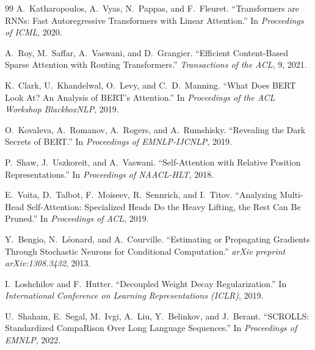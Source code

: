 \documentclass[12pt,a4paper,oneside]{book}
\begin{document}
\begin{thebibliography}{99}
A.~Katharopoulos, A.~Vyas, N.~Pappas, and F.~Fleuret.
``Transformers are RNNs: Fast Autoregressive Transformers with Linear Attention.''
In \textit{Proceedings of ICML}, 2020.

A.~Roy, M.~Saffar, A.~Vaswani, and D.~Grangier.
``Efficient Content-Based Sparse Attention with Routing Transformers.''
\textit{Transactions of the ACL}, 9, 2021.

K.~Clark, U.~Khandelwal, O.~Levy, and C.~D.~Manning.
``What Does BERT Look At? An Analysis of BERT's Attention.''
In \textit{Proceedings of the ACL Workshop BlackboxNLP}, 2019.

O.~Kovaleva, A.~Romanov, A.~Rogers, and A.~Rumshisky.
``Revealing the Dark Secrets of BERT.''
In \textit{Proceedings of EMNLP-IJCNLP}, 2019.

P.~Shaw, J.~Uszkoreit, and A.~Vaswani.
``Self-Attention with Relative Position Representations.''
In \textit{Proceedings of NAACL-HLT}, 2018.

E.~Voita, D.~Talbot, F.~Moiseev, R.~Sennrich, and I.~Titov.
``Analyzing Multi-Head Self-Attention: Specialized Heads Do the Heavy Lifting,
  the Rest Can Be Pruned.''
In \textit{Proceedings of ACL}, 2019.

Y.~Bengio, N.~Léonard, and A.~Courville.
``Estimating or Propagating Gradients Through Stochastic Neurons for Conditional
  Computation.''
\textit{arXiv preprint arXiv:1308.3432}, 2013.

I.~Loshchilov and F.~Hutter.
``Decoupled Weight Decay Regularization.''
In \textit{International Conference on Learning Representations (ICLR)}, 2019.

U.~Shaham, E.~Segal, M.~Ivgi, A.~Liu, Y.~Belinkov, and J.~Berant.
``SCROLLS: Standardized CompaRison Over Long Language Sequences.''
In \textit{Proceedings of EMNLP}, 2022.

\end{thebibliography}
\end{document}
